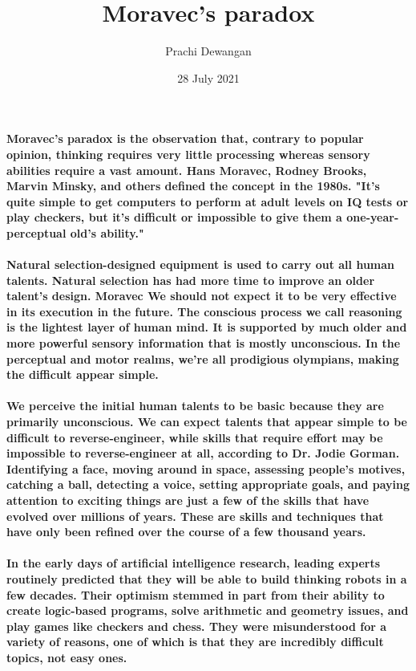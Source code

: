 \documentclass{article}
\title{\vspace{-2cm}Moravec's paradox}
\author{Prachi Dewangan }
\date{28 July 2021}
\begin{document}
		
		\maketitle 
		\paragraph{ Moravec's paradox is the observation that, contrary to popular opinion, thinking requires very little processing whereas sensory abilities require a vast amount. Hans Moravec, Rodney Brooks, Marvin Minsky, and others defined the concept in the 1980s. "It's quite simple to get computers to perform at adult levels on IQ tests or play checkers, but it's difficult or impossible to give them a one-year-perceptual old's ability."}
		
		\paragraph{ Natural selection-designed equipment is used to carry out all human talents. Natural selection has had more time to improve an older talent's design. Moravec We should not expect it to be very effective in its execution in the future. The conscious process we call reasoning is the lightest layer of human mind. It is supported by much older and more powerful sensory information that is mostly unconscious. In the perceptual and motor realms, we're all prodigious olympians, making the difficult appear simple.}
		
		\paragraph{ We perceive the initial human talents to be basic because they are primarily unconscious. We can expect talents that appear simple to be difficult to reverse-engineer, while skills that require effort may be impossible to reverse-engineer at all, according to Dr. Jodie Gorman. Identifying a face, moving around in space, assessing people's motives, catching a ball, detecting a voice, setting appropriate goals, and paying attention to exciting things are just a few of the skills that have evolved over millions of years. These are skills and techniques that have only been refined over the course of a few thousand years.}
		
		\paragraph{ In the early days of artificial intelligence research, leading experts routinely predicted that they will be able to build thinking robots in a few decades. Their optimism stemmed in part from their ability to create logic-based programs, solve arithmetic and geometry issues, and play games like checkers and chess. They were misunderstood for a variety of reasons, one of which is that they are incredibly difficult topics, not easy ones.}
		
\end{document}
